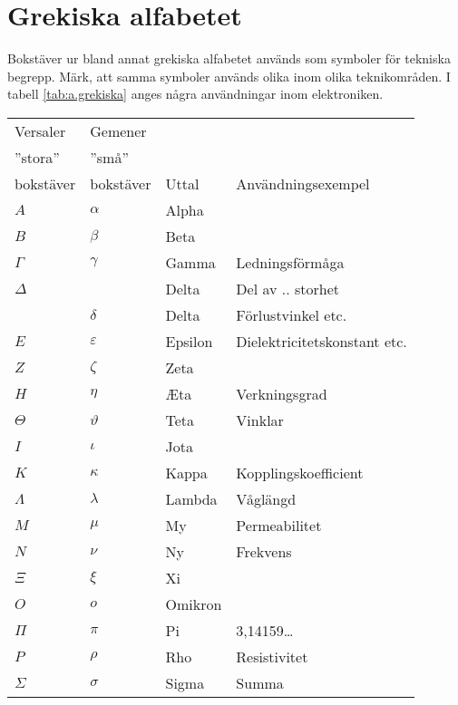\section{Grekiska alfabetet}



  Bokstäver ur bland annat grekiska alfabetet används som symboler för
  tekniska begrepp.
  Märk, att samma symboler används olika inom olika teknikområden.
  I tabell \ref{tab:a.grekiska} anges några användningar inom elektroniken.

\begin{table*}
  \begin{center}
  \begin{tabular}{ll|l|l}
    Versaler  & Gemener   &       & \\
    ''stora'' & ''små''   &       & \\
    bokstäver & bokstäver & Uttal & Användningsexempel \\
    \hline
    \(A\) & \(\alpha\) & Alpha & \\
    \(B\) & \(\beta\) & Beta & \\
    \(\Gamma\) & \(\gamma\) & Gamma & Ledningsförmåga \\
    \(\Delta\) & & Delta & Del av .. storhet \\
    & \(\delta\) & Delta & Förlustvinkel etc. \\
    \(E\) & \(\varepsilon\) & Epsilon & Dielektricitetskonstant etc.\\
    \(Z\) & \(\zeta\) & Zeta & \\
    \(H\) & \(\eta\) & \AE ta & Verkningsgrad\\
    \(\Theta\) & \(\vartheta\) & Teta & Vinklar \\
    \(I\) & \(\iota\) & Jota & \\
    \(K\) & \(\kappa\) & Kappa & Kopplingskoefficient \\
    \(\Lambda\) & \(\lambda\) & Lambda & Våglängd \\
    \(M\) & \(\mu\) & My & Permeabilitet \\
    \(N\) & \(\nu\) & Ny & Frekvens \\
    \(\Xi\) & \(\xi\) & Xi & \\
    \(O\) & \(o\) & Omikron & \\
    \(\Pi\) & \(\pi\) & Pi & 3,14159\dots \\
    \(P\) & \(\rho\) & Rho & Resistivitet \\
    \(\Sigma\) & \(\sigma\) & Sigma & Summa \\

\end{tabular}
\end{center}
\end{table*}
